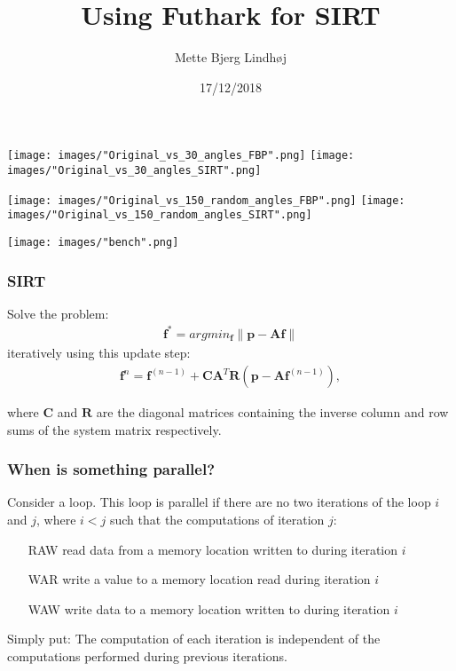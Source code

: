 \documentclass{beamer}
\title[SIRT]{Using Futhark for SIRT} %
\author{Mette Bjerg Lindh\o j} %
\institute[DRCMR] %
{
University of Copenhagen\\ %
}
\date{17/12/2018} %
\newcommand{\norm}[1]{\left\lVert#1\right\rVert}
\renewcommand{\vec}[1]{\ensuremath{\boldsymbol{#1}}}
\newcommand{\mat}[1]{\ensuremath{\boldsymbol{#1}}}
\begin{document}
\begin{frame}
\titlepage %
\end{frame}

\begin{frame}
\centering
\texttt{[image: images/"Original\_vs\_30\_angles\_FBP".png]}
\texttt{[image: images/"Original\_vs\_30\_angles\_SIRT".png]}
\end{frame}

\begin{frame}
\centering
\texttt{[image: images/"Original\_vs\_150\_random\_angles\_FBP".png]}
\texttt{[image: images/"Original\_vs\_150\_random\_angles\_SIRT".png]}
\end{frame}

\begin{frame}
\centering
\texttt{[image: images/"bench".png]}
\end{frame}

\begin{frame}
\frametitle{SIRT}
Solve the problem:
\begin{align}
\vec{f}^{\ast}=argmin_{\vec{f}}\norm{\vec{p}-\mat{A}\vec{f}}
\end{align}
iteratively using this update step:
\begin{align}
\vec{f}^{n} = \vec{f}^{(n-1)}+\mat{C}\mat{A}^{T}\mat{R}(\vec{p}-\mat{A}\vec{f}^{(n-1)}),
\end{align}

where $\mat{C}$ and $\mat{R}$ are the diagonal matrices containing the inverse column and row sums of the system matrix respectively.
\end{frame}

\begin{frame}
\frametitle{When is something parallel?}
Consider a loop. This loop is parallel if there are no two iterations of the loop $i$ and $j$, where $i<j$ such that the computations of iteration $j$:
\begin{itemize}
\item[RAW]{read data from a memory location written to during iteration $i$}
\item[WAR]{write a value to a memory location read during iteration $i$}
\item[WAW]{write data to a memory location written to during iteration $i$}
\end{itemize}
Simply put: The computation of each iteration is independent of the computations performed during previous iterations.
\end{frame}
\end{document}
